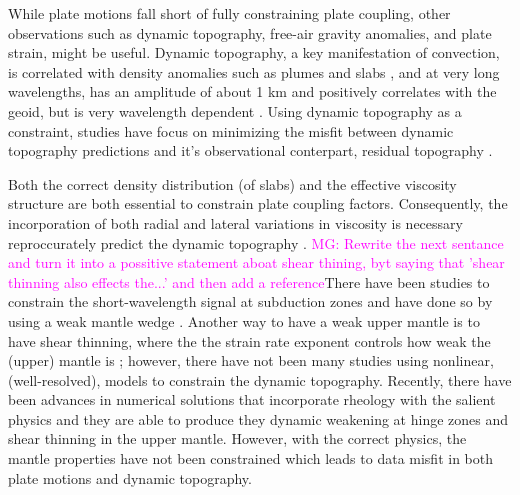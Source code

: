 \documentclass[12pt]{article}
\newcommand{\mgnote}[1]{\textcolor{magenta}{MG: #1}}
\begin{document}
While plate motions fall short of fully constraining plate coupling, other observations such as dynamic topography, free-air gravity anomalies, and plate strain, might be useful.  Dynamic topography, a key manifestation of convection,
is correlated with density anomalies such as plumes and slabs \citep{hager1985lower}, and at very long wavelengths, has an amplitude of about 1 km and positively correlates with the geoid, but is very wavelength dependent \citep{flament2013review}. Using dynamic topography as a constraint, studies have focus on minimizing the misfit between dynamic topography predictions and it's observational conterpart, residual topography \citep{yang2016dynamic}. 

Both the correct density distribution (of slabs) and the effective viscosity structure are both essential to constrain plate coupling factors. Consequently, the incorporation of both radial and lateral variations in viscosity is necessary  reproccurately predict the dynamic topography \citep{moresi1996constraints,kaufmann2000mantle}. 
\mgnote{Rewrite the next sentance and turn it into a possitive statement aboat shear thining, byt saying that 'shear thinning also effects the...' and then add a reference}There have been studies to constrain the short-wavelength signal at subduction zones and have done so by using a weak mantle wedge \citep{billen2001low}. Another way to have a weak upper mantle is to have shear thinning, where the the strain rate exponent controls how weak the (upper) mantle is \citep{karato1993rheology}; however, there have not been many studies using nonlinear, (well-resolved), models to constrain the dynamic topography. Recently, there have been advances in numerical solutions that incorporate rheology with the salient physics and they are able to produce they dynamic weakening at hinge zones and shear thinning in the upper mantle. However, with the correct physics, the mantle properties have not been constrained \citep{Stadler27082010,JGRB17312} which leads to data misfit in both plate motions and dynamic topography.
\end{document}
